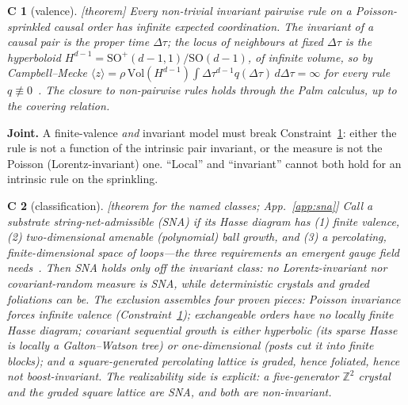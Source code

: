 \documentclass[aps,prd,reprint,nofootinbib,superscriptaddress,floatfix]{revtex4-2}
\newtheorem{constraint}{C}
\begin{document}
\begin{constraint}[valence]
\label{c:valence}
{\rm[theorem]} Every non-trivial invariant pairwise rule on a Poisson-sprinkled causal
order has \emph{infinite} expected coordination. The invariant of a causal pair is the
proper time $\Delta\tau$; the locus of neighbours at fixed $\Delta\tau$ is the hyperboloid
$H^{d-1}=\mathrm{SO}^+(d-1,1)/\mathrm{SO}(d-1)$, of infinite volume, so by Campbell--Mecke
$\langle z\rangle=\rho\,\mathrm{Vol}(H^{d-1})\int\Delta\tau^{d-1}q(\Delta\tau)\,d\Delta\tau
=\infty$ for every rule $q\not\equiv0$~\cite{CorePaper}. The closure to non-pairwise rules
holds through the Palm calculus, up to the covering relation.
\end{constraint}

\noindent\textbf{Joint.} A finite-valence \emph{and} invariant model must break
Constraint~\ref{c:valence}: either the rule is not a function of the intrinsic pair
invariant, or the measure is not the Poisson (Lorentz-invariant) one. ``Local'' and
``invariant'' cannot both hold for an intrinsic rule on the sprinkling.

\begin{constraint}[classification]
\label{c:sna}
{\rm[theorem for the named classes; App.~\ref{app:sna}]} Call a substrate
\emph{string-net-admissible} (SNA) if its Hasse diagram has (1) finite valence, (2)
two-dimensional amenable (polynomial) ball growth, and (3) a percolating, finite-dimensional
space of loops---the three requirements an emergent gauge field needs~\cite{WenComplement}.
Then \emph{SNA holds only off the invariant class}: no Lorentz-invariant nor
covariant-random measure is SNA, while deterministic crystals and graded foliations can be.
The exclusion assembles four proven pieces: Poisson invariance forces infinite valence
(Constraint~\ref{c:valence}); exchangeable orders have no locally finite Hasse diagram;
covariant sequential growth is either hyperbolic (its sparse Hasse is locally a
Galton--Watson tree) or one-dimensional (posts cut it into finite blocks); and a
square-generated percolating lattice is graded, hence foliated, hence not boost-invariant.
The realizability side is explicit: a five-generator $\mathbb Z^2$ crystal and the graded
square lattice are SNA, and both are non-invariant.
\end{constraint}
\end{document}
